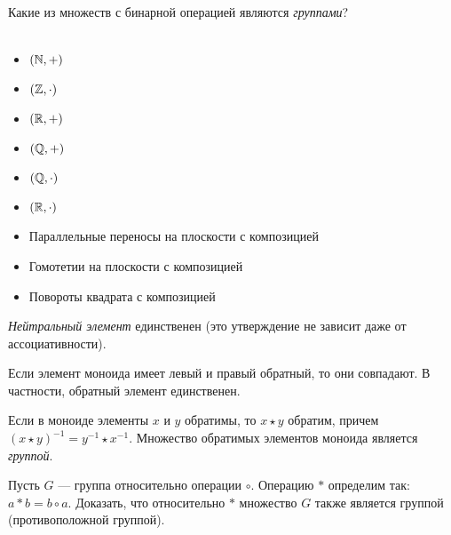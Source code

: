 \documentclass{article}
\begin{document}
\begin{task_boxed}
	Какие из множеств с бинарной операцией являются \textit{группами}?\\
	\\
	\begin{minipage}[c]{0.15\textwidth}
		\begin{itemize}
			\item $(\mathbb{N}, +)$
			\item $(\mathbb{Z}, \cdot)$
			\item $(\mathbb{R}, +)$
		\end{itemize}
	\end{minipage}
	\begin{minipage}[c]{0.15\textwidth}
		\begin{itemize}
			\item $(\mathbb{Q}, +)$
			\item $(\mathbb{Q}, \cdot)$
			\item $(\mathbb{R}, \cdot)$
		\end{itemize}
	\end{minipage}
	\begin{minipage}[c]{0.7\textwidth}
		\begin{itemize}
			\item Параллельные переносы на плоскости с композицией
			\item Гомотетии на плоскости с композицией
			\item Повороты квадрата с композицией
		\end{itemize}
	\end{minipage}
\end{task_boxed}

\begin{task_boxed}
	\textit{Нейтральный элемент} единственен (это утверждение не зависит даже от ассоциативности).
\end{task_boxed}

\begin{task_boxed}
	Если элемент моноида имеет левый и правый обратный, то они совпадают. В частности, обратный элемент единственен.
\end{task_boxed}

\begin{task_boxed}\label{mul-sub-gr}
	Если в моноиде элементы $x$ и $y$ обратимы, то $x \star y$ обратим, причем $(x \star y)^{-1} = y^{-1} \star x^{-1}$. Множество обратимых элементов моноида является \textit{группой}.
\end{task_boxed}

\begin{task_boxed}
	Пусть $G$ — группа относительно операции $\circ$. Операцию $*$ определим так: $a * b = b \circ a$. Доказать, что
	относительно $*$ множество $G$ также является группой (противоположной группой).
\end{task_boxed}
\end{document}
